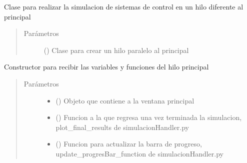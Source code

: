 \documentclass[letterpaper,10pt,spanish]{sphinxmanual}
\begin{document}
\begin{fulllineitems}
\label{\detokenize{codigos/rutinas_simulacion:rutinas_simulacion.SimpleThread}}
Clase para realizar la simulacion de sistemas de control en un hilo diferente al principal
\begin{quote}\begin{description}
\item[{Parámetros}] \leavevmode
{} () \textendash{} Clase para crear un hilo paralelo al principal

\end{description}\end{quote}

\begin{fulllineitems}
\label{\detokenize{codigos/rutinas_simulacion:rutinas_simulacion.SimpleThread.__init__}}
Constructor para recibir las variables y funciones del hilo principal
\begin{quote}\begin{description}
\item[{Parámetros}] \leavevmode\begin{itemize}
\item {} 
 () \textendash{} Objeto que contiene a la ventana principal

\item {} 
 () \textendash{} Funcion a la que regresa una vez terminada la simulacion, plot\_final\_results de simulacionHandler.py

\item {} 
 () \textendash{} Funcion para actualizar la barra de progreso, update\_progresBar\_function de simulacionHandler.py


\end{itemize}
\end{description}
\end{quote}
\end{fulllineitems}
\end{fulllineitems}
\end{document}
